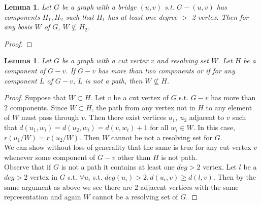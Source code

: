 \documentclass[11pt]{amsart}
\theoremstyle{plain}  %
\newtheorem{lem}[thm]{Lemma}
\theoremstyle{definition}
\theoremstyle{remark}
\numberwithin{equation}{thm}
\begin{document}
\begin{lem}
 Let $G$ be a graph with a bridge $(u,v)$ s.t. $G-(u,v)$ has components $H_1, H_2$ such that $H_1$ 
 has at least one degree $>$ 2 vertex. Then for any basis $W$ of $G$, $W\nsubseteq H_2$.
\end{lem}
\begin{proof}
 
\end{proof}
\begin{lem}
 Let $G$ be a graph with a cut vertex $v$ and resolving set $W$. Let $H$ be a component of $G-v$. 
 If $G-v$ has more than two components or if for any component $L$ of $G-v$, $L$ is not a path, then $W\nsubseteq H$.
\end{lem}
\begin{proof}
 Suppose that $W \subset H$. 
 Let $v$ be a cut vertex of $G$ s.t. $G-v$ has more than 2 components. Since $W \subset H$, the path from any vertex not in $H$ to any element of $W$ must pass through $v$.
 Then there exist vertices $u_1,\ u_2$ adjacent to $v$ such that $d(u_1, w_i) = d(u_2, w_i) = d(v, w_i) + 1$ for all $w_i \in W$.
 In this case, $r(u_1/W) = r(u_2/W)$. Then $W$ cannot be not a resolving set for $G$.\\
 We can show without loss of generality that the same is true for any cut vertex $v$ whenever some component of $G-v$ other than $H$ is not path.\\
 Observe that if $G$ is not a path it contains at least one $deg > 2$ vertex. 
 Let $l$ be a $deg > 2$ vertex in $G$ s.t. $\forall u_i$ s.t. $deg(u_i)>2, d(u_i, v) \geq d(l, v)$. 
 Then by the same argument as above we see there are 2 adjacent vertices with the same representation and again $W$ cannot be a resolving set of $G$.
 \end{proof}

 






\cite{Chartrand:2010:GDF:1941879}
\nocite{*}

\end{document}
